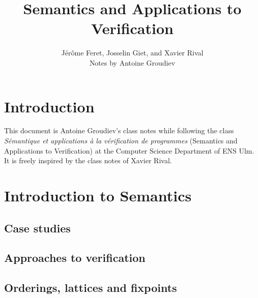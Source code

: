\documentclass[toc]{../cs-classes/cs-classes}
\author{Jérôme Feret, Josselin Giet, and Xavier Rival\\ Notes by Antoine Groudiev}
\title{Semantics and Applications to Verification}
\begin{document}
\section*{Introduction}
This document is Antoine Groudiev's class notes while following the class \emph{Sémantique et applications à la vérification de programmes} (Semantics and Applications to Verification) at the Computer Science Department of ENS Ulm. It is freely inspired by the class notes of Xavier Rival. 

\section{Introduction to Semantics}

\subsection{Case studies}

\subsection{Approaches to verification}

\subsection{Orderings, lattices and fixpoints}
\end{document}
